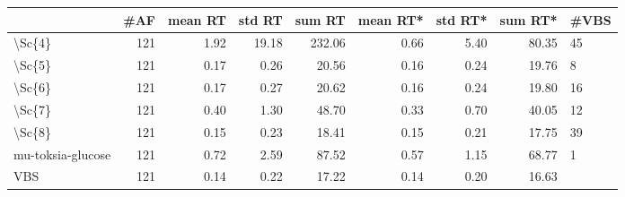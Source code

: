 \begin{tabular}{lrrrrrrrl}
\toprule
{} &  \#AF &  mean RT &  std RT &  sum RT &  mean RT* &  std RT* &  sum RT* & \#VBS \\
\midrule
\textbackslash Sc\{4\}            &  121 &     1.92 &   19.18 &  232.06 &      0.66 &     5.40 &    80.35 &   45 \\
\textbackslash Sc\{5\}            &  121 &     0.17 &    0.26 &   20.56 &      0.16 &     0.24 &    19.76 &    8 \\
\textbackslash Sc\{6\}            &  121 &     0.17 &    0.27 &   20.62 &      0.16 &     0.24 &    19.80 &   16 \\
\textbackslash Sc\{7\}            &  121 &     0.40 &    1.30 &   48.70 &      0.33 &     0.70 &    40.05 &   12 \\
\textbackslash Sc\{8\}            &  121 &     0.15 &    0.23 &   18.41 &      0.15 &     0.21 &    17.75 &   39 \\
mu-toksia-glucose &  121 &     0.72 &    2.59 &   87.52 &      0.57 &     1.15 &    68.77 &    1 \\
VBS               &  121 &     0.14 &    0.22 &   17.22 &      0.14 &     0.20 &    16.63 &      \\
\bottomrule
\end{tabular}
